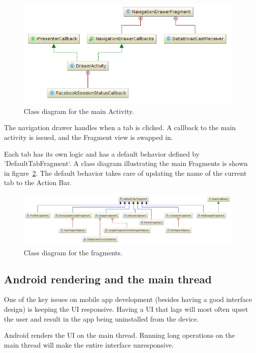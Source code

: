 \begin{figure}[H]
\includegraphics[width=\textwidth]{ch/architecture/fig/class_diagram_drawer.png}
\caption{Class diagram for the main Activity.}
\label{fig:classDiagramDrawer}
\end{figure}

The navigation drawer handles when a tab is clicked. A callback to the main activity is issued, and the Fragment view is swapped in.

Each tab has its own logic and has a default behavior defined by 'DefaultTabFragment`. A class diagram illustrating the main Fragments is shown in figure~\ref{fig:classDiagramFragments}. The default behavior takes care of updating the name of the current tab to the Action Bar.

\begin{figure}[H]
\includegraphics[width=\textwidth]{ch/architecture/fig/class_diagram_fragments.png}
\caption{Class diagram for the fragments.}
\label{fig:classDiagramFragments}
\end{figure}

\subsection{Android rendering and the main thread}
One of the key issues on mobile app development (besides having a good interface design) is keeping the \gls{UI} responsive. Having a UI that lags will most often upset the user and result in the app being uninstalled from the device.

Android renders the UI on the main thread. Running long operations on the main thread will make the entire interface unresponsive.

